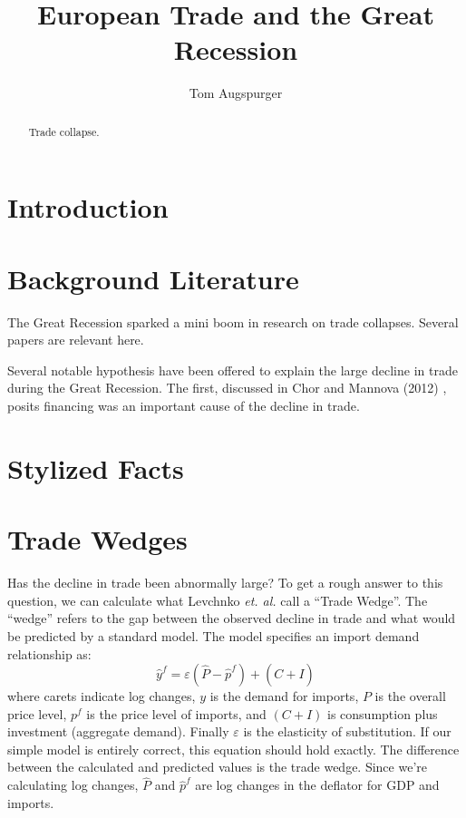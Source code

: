 \documentclass[11pt]{article}
\title{European Trade and the Great Recession}
\author{Tom Augspurger}
\date{}
\begin{document}
\maketitle
\begin{abstract}
  Trade collapse.
\end{abstract}
\section{Introduction}
\label{sec:introduction}

\section{Background Literature}
\label{sec:background_literature}
  The Great Recession sparked a mini boom in research on trade collapses.  Several papers are relevant here.

  Several notable hypothesis have been offered to explain the large decline in trade during the Great Recession.  The first, discussed in Chor and Mannova (2012) \cite{chor-manova:2012}, posits financing was an important cause of the decline in trade.

\section{Stylized Facts} %
\label{sec:stylized_facts}



\section{Trade Wedges} %
\label{sec:trade_wedges}
  Has the decline in trade been abnormally large?  To get a rough answer to this question, we can calculate what Levchnko \emph{et. al.} \cite{llt:2010} call a ``Trade Wedge''.  The ``wedge'' refers to the gap between the observed decline in trade and what would be predicted by a standard model.  The model specifies an import demand relationship as:
  \begin{equation}
      \hat{y}^f = \varepsilon(\hat{P} - \hat{p}^f) + (\hat{C + I})
  \end{equation}
  where carets indicate log changes, $y$ is the demand for imports, $P$ is the overall price level, $p^f$ is the price level of imports, and $(C + I)$ is consumption plus investment (aggregate demand).  Finally $\varepsilon$ is the elasticity of substitution.  If our simple model is entirely correct, this equation should hold exactly.  The difference between the calculated and predicted values is the trade wedge.  Since we're calculating log changes, $\hat{P}$ and $\hat{p}^f$ are log changes in the deflator for GDP and imports.
\end{document}
